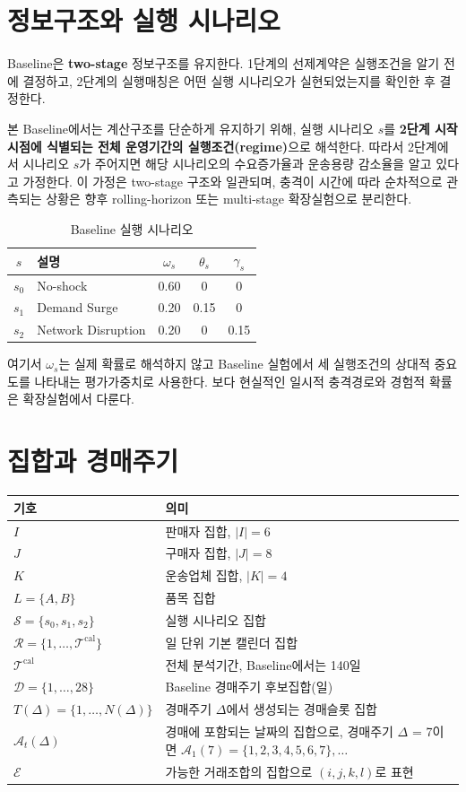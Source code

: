 \documentclass[11pt,a4paper]{article}
\newcommand{\Tcal}{\mathcal T^{\mathrm{cal}}}
\newcommand{\Scen}{\mathcal S}
\newcommand{\Dset}{\mathcal D}
\newcommand{\Rset}{\mathcal R}
\newcommand{\Aset}{\mathcal A}
\newcommand{\Eset}{\mathcal E}
\begin{document}
\section{정보구조와 실행 시나리오}

Baseline은 \textbf{two-stage} 정보구조를 유지한다.
1단계의 선제계약은 실행조건을 알기 전에 결정하고,
2단계의 실행매칭은 어떤 실행 시나리오가 실현되었는지를 확인한 후 결정한다.

본 Baseline에서는 계산구조를 단순하게 유지하기 위해,
실행 시나리오 $s$를 \textbf{2단계 시작 시점에 식별되는 전체 운영기간의 실행조건(regime)}으로 해석한다.
따라서 2단계에서 시나리오 $s$가 주어지면 해당 시나리오의 수요증가율과 운송용량 감소율을 알고 있다고 가정한다.
이 가정은 two-stage 구조와 일관되며, 충격이 시간에 따라 순차적으로 관측되는 상황은
향후 rolling-horizon 또는 multi-stage 확장실험으로 분리한다.

\begin{table}[h!]
\centering
\caption{Baseline 실행 시나리오}
\begin{tabular}{clccc}
\toprule
$s$ & \textbf{설명} & $\omega_s$ & $\theta_s$ & $\gamma_s$ \\
\midrule
$s_0$ & No-shock & 0.60 & 0 & 0 \\
$s_1$ & Demand Surge & 0.20 & 0.15 & 0 \\
$s_2$ & Network Disruption & 0.20 & 0 & 0.15 \\
\bottomrule
\end{tabular}
\end{table}

여기서 $\omega_s$는 실제 확률로 해석하지 않고 Baseline 실험에서 세 실행조건의 상대적 중요도를 나타내는 평가가중치로 사용한다.
보다 현실적인 일시적 충격경로와 경험적 확률은 확장실험에서 다룬다.

\section{집합과 경매주기}

\begin{longtable}{@{}p{}p{}@{}}
\toprule
\textbf{기호} & \textbf{의미} \\
\midrule
$I$ & 판매자 집합, $|I|=6$ \\
$J$ & 구매자 집합, $|J|=8$ \\
$K$ & 운송업체 집합, $|K|=4$ \\
$L=\{A,B\}$ & 품목 집합 \\
$\Scen=\{s_0,s_1,s_2\}$ & 실행 시나리오 집합 \\
$\Rset=\{1,\ldots,\Tcal\}$ & 일 단위 기본 캘린더 집합 \\
$\Tcal$ & 전체 분석기간, Baseline에서는 140일 \\
$\Dset=\{1,\ldots,28\}$ & Baseline 경매주기 후보집합(일) \\
$T(\Delta)=\{1,\ldots,N(\Delta)\}$ & 경매주기 $\Delta$에서 생성되는 경매슬롯 집합 \\
$\Aset_t(\Delta)$ & 경매에 포함되는 날짜의 집합으로, 경매주기 $\Delta$ = 7이면 $\Aset_1(7) = \{1,2,3,4,5,6,7\} ,\ldots$   \\
$\Eset$ & 가능한 거래조합의 집합으로 $(i,j,k,l)$로 표현\\
\bottomrule
\end{longtable}
\end{document}

